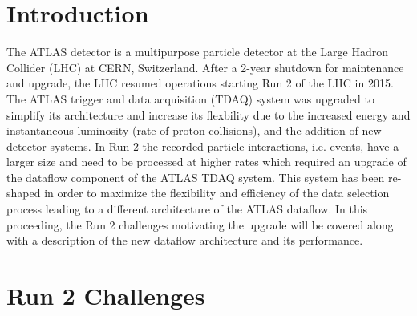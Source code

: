 \graphicspath{{figures/roib/}}


\section{Introduction}

The ATLAS detector \cite{1748-0221-3-08-S08003} is a multipurpose particle detector
at the Large Hadron Collider (LHC) at CERN, Switzerland. After a 2-year shutdown 
 for maintenance and upgrade, the LHC resumed operations starting Run 2 of the LHC in 2015.
The ATLAS trigger and data acquisition (TDAQ) system was upgraded 
to simplify its architecture and increase its flexbility due to the
increased energy and instantaneous luminosity (rate of proton collisions), and the 
addition of new detector systems. 
In Run 2 the recorded particle interactions, i.e. events, have a larger size and 
need to be processed at higher rates which required an upgrade of the dataflow 
component of the ATLAS TDAQ system. This system has been re-shaped in order to maximize 
the flexibility and efficiency of the data selection process leading to a different architecture of the ATLAS dataflow. 
In this proceeding, the Run 2 challenges motivating the upgrade will be covered along with 
a description of the new dataflow architecture and its performance. 


\section{Run 2 Challenges}

